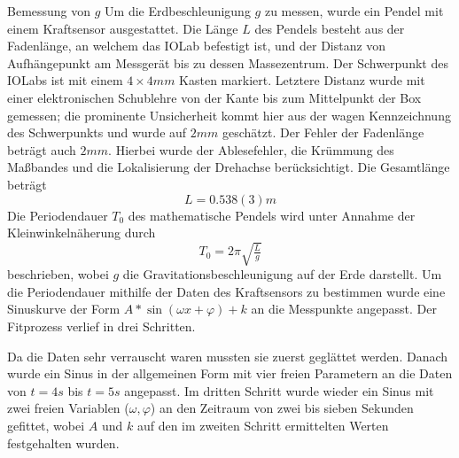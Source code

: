 \documentclass{alex_gp}
\begin{document}
\begin{mybox}{Bemessung von \( g \)}
	Um die Erdbeschleunigung \( g \) zu messen, wurde ein Pendel mit einem Kraftsensor ausgestattet. Die Länge \( L \) des Pendels besteht aus der Fadenlänge, an welchem das IOLab befestigt ist, und der Distanz von Aufhängepunkt am Messgerät bis zu dessen Massezentrum. Der Schwerpunkt des IOLabs ist mit einem \( 4\times 4 \unit{mm} \) Kasten markiert. Letztere Distanz wurde mit einer elektronischen Schublehre von der Kante bis zum Mittelpunkt der Box gemessen; die prominente Unsicherheit kommt hier aus der wagen Kennzeichnung des Schwerpunkts und wurde auf \( 2 \unit{mm} \) geschätzt. Der Fehler der Fadenlänge beträgt auch \( 2 \unit{mm} \). Hierbei wurde der Ablesefehler, die Krümmung des Maßbandes und die Lokalisierung der Drehachse berücksichtigt. Die Gesamtlänge beträgt 
	\begin{equation}
		L = 0.538(3) \unit{m}
	\end{equation}
	Die Periodendauer \( T_0 \) des mathematische Pendels wird unter Annahme der Kleinwinkelnäherung durch 
	\begin{equation}\label{eqn:T0}
		T_0 = 2\pi\sqrt{\tfrac{L}{g}}
	\end{equation}
	beschrieben, wobei \( g \) die Gravitationsbeschleunigung auf der Erde darstellt. Um die Periodendauer mithilfe der Daten des Kraftsensors zu bestimmen wurde eine Sinuskurve der Form \( A * \sin(\omega x + \varphi) + k \) an die Messpunkte angepasst. Der Fitprozess verlief in drei Schritten.
	
	Da die Daten sehr verrauscht waren mussten sie zuerst geglättet werden. Danach wurde ein Sinus in der allgemeinen Form mit vier freien Parametern an die Daten von \( t = 4 \unit{s} \) bis \( t = 5 \unit{s} \) angepasst. Im dritten Schritt wurde wieder ein Sinus mit zwei freien Variablen (\( \omega, \varphi \)) an den Zeitraum von zwei bis sieben Sekunden gefittet, wobei \( A \) und \( k \) auf den im zweiten Schritt ermittelten Werten festgehalten wurden. 
	

\end{mybox}
\end{document}
